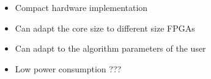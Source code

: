 \begin{itemize}
\item Compact hardware implementation
\item Can adapt the core size to different size FPGAs
\item Can adapt to the algorithm parameters of the user
\item Low power consumption ???
\end{itemize}
